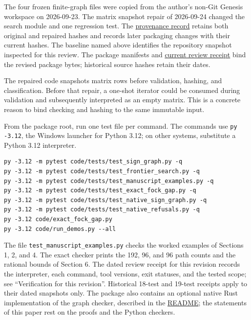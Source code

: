\documentclass[
  11pt,
]{article}
\newcommand{\passthrough}[1]{#1}
\begin{document}
The four frozen finite-graph files were copied from the author's non-Git
Genesis workspace on 2026-09-23. The matrix snapshot repair of
2026-09-24 changed the search module and one regression test. The
\href{https://github.com/dbccpage/the_symbol_game/blob/main/education/documentation/030_pfp_proposal_fidelity_protocol_pfp/papers/symbol_game/002_pfp_signed_presentations_and_search_frontier/code/PROVENANCE.md}{provenance
record} retains both original and repaired hashes and records later
packaging changes with their current hashes. The baseline named above
identifies the repository snapshot inspected for this review. The
package manifests and
\href{https://github.com/dbccpage/the_symbol_game/blob/main/education/documentation/030_pfp_proposal_fidelity_protocol_pfp/papers/symbol_game/002_pfp_signed_presentations_and_search_frontier/docs/preprint_review_validation_2026_10_02.json}{current
review receipt} bind the revised package bytes; historical source hashes
retain their dates.

The repaired code snapshots matrix rows before validation, hashing, and
classification. Before that repair, a one-shot iterator could be
consumed during validation and subsequently interpreted as an empty
matrix. This is a concrete reason to bind checking and hashing to the
same immutable input.

From the package root, run one test file per command. The commands use
\passthrough{\lstinline!py -3.12!}, the Windows launcher for Python
3.12; on other systems, substitute a Python 3.12 interpreter.

\begin{lstlisting}
py -3.12 -m pytest code/tests/test_sign_graph.py -q
py -3.12 -m pytest code/tests/test_frontier_search.py -q
py -3.12 -m pytest code/tests/test_manuscript_examples.py -q
py -3.12 -m pytest code/tests/test_exact_fock_gap.py -q
py -3.12 -m pytest code/tests/test_native_sign_graph.py -q
py -3.12 -m pytest code/tests/test_native_refusals.py -q
py -3.12 code/exact_fock_gap.py
py -3.12 code/run_demos.py --all
\end{lstlisting}

The file \nolinkurl{test_manuscript_examples.py} checks the worked
examples of Sections 1, 2, and 4. The exact checker prints the 192, 96,
and 96 path counts and the rational bounds of Section 6. The dated
review receipt for this revision records the interpreter, each command,
tool versions, exit statuses, and the tested scope; see ``Verification
for this revision''. Historical 18-test and 19-test receipts apply to
their dated snapshots only. The package also contains an optional native
Rust implementation of the graph checker, described in the
\href{https://github.com/dbccpage/the_symbol_game/blob/main/education/documentation/030_pfp_proposal_fidelity_protocol_pfp/papers/symbol_game/002_pfp_signed_presentations_and_search_frontier/README.md}{README};
the statements of this paper rest on the proofs and the Python checkers.
\end{document}
